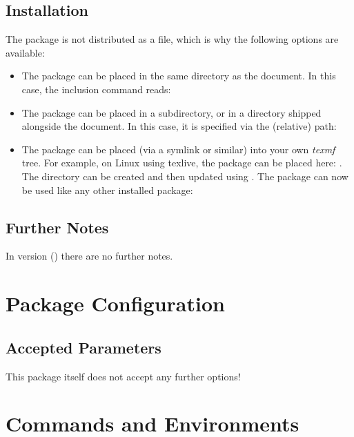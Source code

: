 \documentclass{sopra-base}
\begin{document}
\subsection{Installation}
    The package is not distributed as a  file, which is why the
    following options are available:
    \begin{itemize}
        \item The package can be placed in the same directory as the document.
                In this case, the inclusion command reads:
\begin{plainlatex}
\usepackage{sopra-models}
\end{plainlatex}
        \item The package can be placed in a subdirectory, or in a
                directory shipped alongside the document. In
                this case, it is specified via the (relative) path:
\begin{plainlatex}
\usepackage{./My/Path/to/sopra-models}
\end{plainlatex}
        \item The package can be placed (via a symlink or similar)
              into your own \emph{texmf} tree.
              For example, on Linux using texlive,
              the package can be placed here: .
              The directory can be created and then
              updated using . The
              package can now be used like any other installed package:
\begin{plainlatex}
\usepackage{sopra-models}
\end{plainlatex}
    \end{itemize}

\subsection{Further Notes}
In version \thesomversion{} () there are no further
notes.

\section{Package Configuration}
    \subsection{Accepted Parameters}
    This package itself does not accept any further options!

\section{Commands and Environments}
\end{document}
